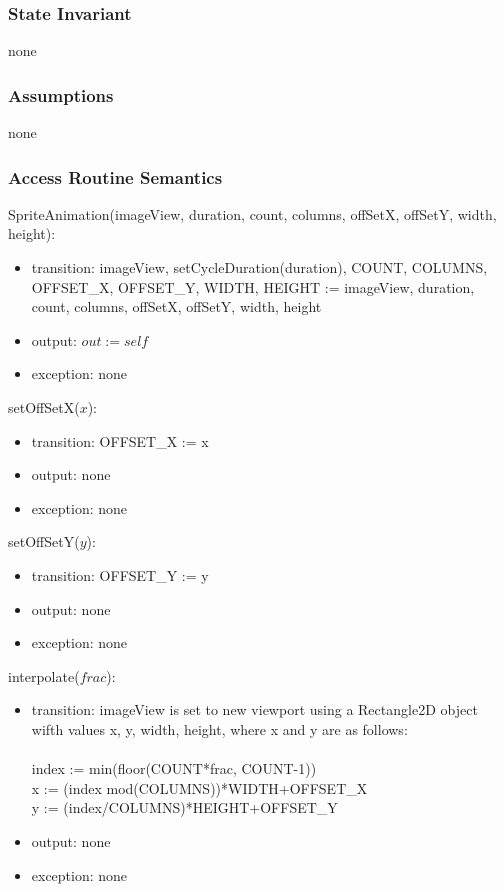 \documentclass[12pt, titlepage]{article}
\begin{document}
\subsubsection {State Invariant}
none
\subsubsection {Assumptions}
none
\subsubsection {Access Routine Semantics}
SpriteAnimation(imageView, duration, count, columns, offSetX, offSetY, width, height):
\begin{itemize}
\item transition: imageView, setCycleDuration(duration), COUNT, COLUMNS, OFFSET\_X, OFFSET\_Y, WIDTH, HEIGHT  := imageView, duration, count, columns, offSetX, offSetY, width, height
\item output: $out := \mathit{self}$
\item exception: none
\end{itemize}
\noindent setOffSetX($x$):
\begin{itemize}
\item transition: OFFSET\_X := x
\item output: none
\item exception: none
\end{itemize}
\noindent setOffSetY($y$):
\begin{itemize}
\item transition: OFFSET\_Y := y
\item output: none
\item exception: none
\end{itemize}
\noindent interpolate($frac$):
\begin{itemize}
\item transition: imageView is set to new viewport using a Rectangle2D object wifth values x, y, width, height, where x and y are as follows: \\ \\
index := min(floor(COUNT*frac, COUNT-1)) \\ 
x := (index mod(COLUMNS))*WIDTH+OFFSET\_X \\
y := (index/COLUMNS)*HEIGHT+OFFSET\_Y \\
\item output: none
\item exception: none
\end{itemize}
\end{document}
